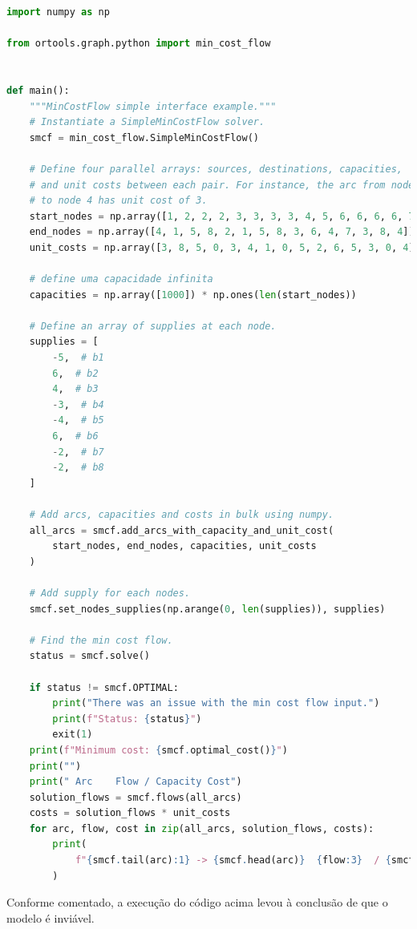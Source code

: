\documentclass{article}
\begin{document}
\begin{lstlisting}[language=Python, caption=Exemplo de código Python utilizando OR-Tools]
import numpy as np

from ortools.graph.python import min_cost_flow


def main():
    """MinCostFlow simple interface example."""
    # Instantiate a SimpleMinCostFlow solver.
    smcf = min_cost_flow.SimpleMinCostFlow()

    # Define four parallel arrays: sources, destinations, capacities,
    # and unit costs between each pair. For instance, the arc from node 1
    # to node 4 has unit cost of 3.
    start_nodes = np.array([1, 2, 2, 2, 3, 3, 3, 3, 4, 5, 6, 6, 6, 6, 7])
    end_nodes = np.array([4, 1, 5, 8, 2, 1, 5, 8, 3, 6, 4, 7, 3, 8, 4])
    unit_costs = np.array([3, 8, 5, 0, 3, 4, 1, 0, 5, 2, 6, 5, 3, 0, 4])

    # define uma capacidade infinita
    capacities = np.array([1000]) * np.ones(len(start_nodes))

    # Define an array of supplies at each node.
    supplies = [
        -5,  # b1
        6,  # b2
        4,  # b3
        -3,  # b4
        -4,  # b5
        6,  # b6
        -2,  # b7
        -2,  # b8
    ]

    # Add arcs, capacities and costs in bulk using numpy.
    all_arcs = smcf.add_arcs_with_capacity_and_unit_cost(
        start_nodes, end_nodes, capacities, unit_costs
    )

    # Add supply for each nodes.
    smcf.set_nodes_supplies(np.arange(0, len(supplies)), supplies)

    # Find the min cost flow.
    status = smcf.solve()

    if status != smcf.OPTIMAL:
        print("There was an issue with the min cost flow input.")
        print(f"Status: {status}")
        exit(1)
    print(f"Minimum cost: {smcf.optimal_cost()}")
    print("")
    print(" Arc    Flow / Capacity Cost")
    solution_flows = smcf.flows(all_arcs)
    costs = solution_flows * unit_costs
    for arc, flow, cost in zip(all_arcs, solution_flows, costs):
        print(
            f"{smcf.tail(arc):1} -> {smcf.head(arc)}  {flow:3}  / {smcf.capacity(arc):3}       {cost}"
        )
\end{lstlisting}

Conforme comentado, a execução do código acima levou à conclusão de que o modelo é inviável.
\end{document}

